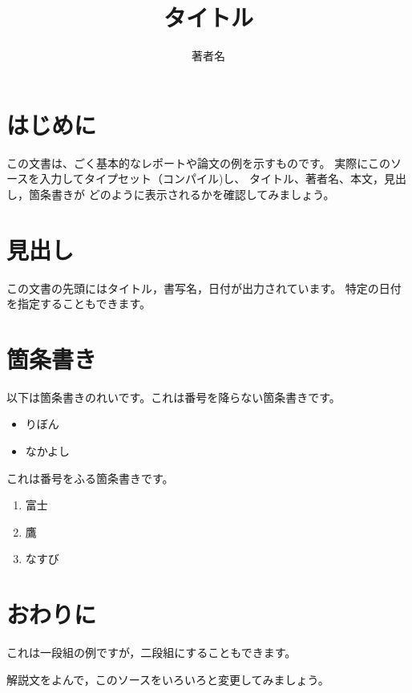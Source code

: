 \documentclass[twocolumn]{jsarticle}
\begin{document}
\title{タイトル}
\author{著者名}
\maketitle

\section{はじめに}

この文書は、ごく基本的なレポートや論文の例を示すものです。
実際にこのソースを入力してタイプセット（コンパイル)し、
タイトル、著者名、本文，見出し，箇条書きが
どのように表示されるかを確認してみましょう。

\section{見出し}

この文書の先頭にはタイトル，書写名，日付が出力されています。
特定の日付を指定することもできます。

\section{箇条書き}

以下は箇条書きのれいです。これは番号を降らない箇条書きです。

\begin{itemize}
  \item りぼん
  \item なかよし
\end{itemize}

これは番号をふる箇条書きです。

\begin{enumerate}
  \item 富士
  \item 鷹
  \item なすび
\end{enumerate}

\section{おわりに}

これは一段組の例ですが，二段組にすることもできます。

解説文をよんで，このソースをいろいろと変更してみましょう。
\end{document}
